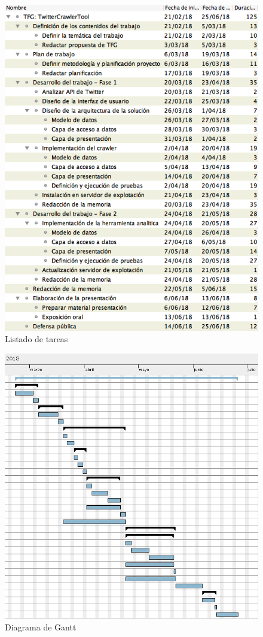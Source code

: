 \documentclass[11pt,a4paper]{article}
\begin{document}
\begin{figure}[H]
\centering
\includegraphics[scale=0.4]{listado-tareas.png}
\caption{Listado de tareas}
\end{figure}

\begin{figure}[H]
\centering
\includegraphics[scale=0.3]{diagrama-gantt.png}
\caption{Diagrama de Gantt}
\end{figure}
\end{document}
